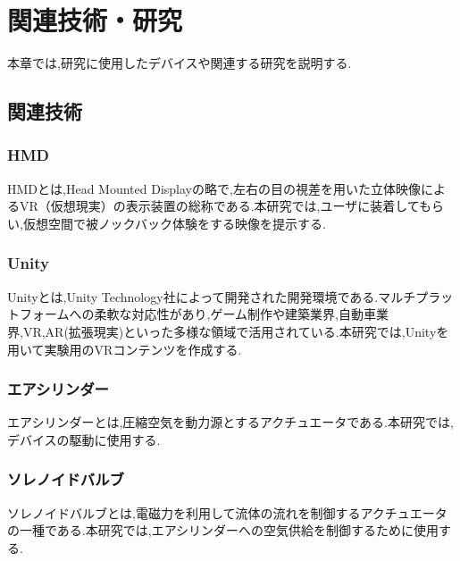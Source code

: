 \chapter{関連技術・研究}

本章では,研究に使用したデバイスや関連する研究を説明する.

\section{関連技術}

\subsection{HMD}

HMDとは,Head Mounted Displayの略で,左右の目の視差を用いた立体映像によるVR（仮想現実）の表示装置の総称である.本研究では,ユーザに装着してもらい,仮想空間で被ノックバック体験をする映像を提示する.


\subsection{Unity}

Unityとは,Unity Technology社によって開発された開発環境である.マルチプラットフォームへの柔軟な対応性があり,ゲーム制作や建築業界,自動車業界,VR,AR(拡張現実)といった多様な領域で活用されている.本研究では,Unityを用いて実験用のVRコンテンツを作成する.

\subsection{エアシリンダー}

エアシリンダーとは,圧縮空気を動力源とするアクチュエータである.本研究では,デバイスの駆動に使用する.

\subsection{ソレノイドバルブ}

ソレノイドバルブとは,電磁力を利用して流体の流れを制御するアクチュエータの一種である.本研究では,エアシリンダーへの空気供給を制御するために使用する.

